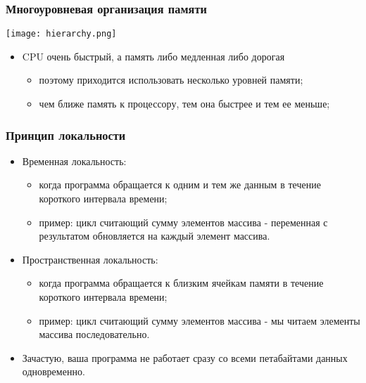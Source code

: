 \begin{frame}
\frametitle{Многоуровневая организация памяти}
\begin{center}
  \texttt{[image: hierarchy.png]}
\end{center}
\begin{itemize}
  \item CPU очень быстрый, а память либо медленная либо дорогая
  \begin{itemize}
    \item поэтому приходится использовать несколько уровней памяти;
    \item чем ближе память к процессору, тем она быстрее и тем ее меньше;
  \end{itemize}
\end{itemize}
\end{frame}

\begin{frame}
\frametitle{Принцип локальности}
\begin{itemize}
  \item Временная локальность:
  \begin{itemize}
    \item когда программа обращается к одним и тем же данным в течение короткого
    интервала времени;
    \item пример: цикл считающий сумму элементов массива - переменная с
    результатом обновляется на каждый элемент массива.
  \end{itemize}
  \item Пространственная локальность:
  \begin{itemize}
    \item когда программа обращается к близким ячейкам памяти в течение
    короткого интервала времени;
    \item пример: цикл считающий сумму элементов массива - мы читаем элементы
    массива последовательно.
  \end{itemize}
  \item Зачастую, ваша программа не работает сразу со всеми петабайтами данных
  одновременно.
\end{itemize}
\end{frame}

